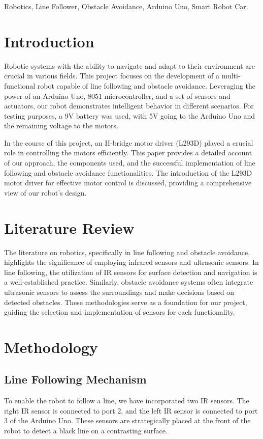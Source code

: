 \documentclass[conference]{IEEEtran}
\begin{document}
\begin{IEEEkeywords}
Robotics, Line Follower, Obstacle Avoidance, Arduino Uno, Smart Robot Car.
\end{IEEEkeywords}

\section{Introduction}
Robotic systems with the ability to navigate and adapt to their environment are crucial in various fields. This project focuses on the development of a multi-functional robot capable of line following and obstacle avoidance. Leveraging the power of an Arduino Uno, 8051 microcontroller, and a set of sensors and actuators, our robot demonstrates intelligent behavior in different scenarios. For testing purposes, a 9V battery was used, with 5V going to the Arduino Uno and the remaining voltage to the motors.

In the course of this project, an H-bridge motor driver (L293D) played a crucial role in controlling the motors efficiently. This paper provides a detailed account of our approach, the components used, and the successful implementation of line following and obstacle avoidance functionalities. The introduction of the L293D motor driver for effective motor control is discussed, providing a comprehensive view of our robot's design.

\section{Literature Review}
The literature on robotics, specifically in line following and obstacle avoidance, highlights the significance of employing infrared sensors and ultrasonic sensors. In line following, the utilization of IR sensors for surface detection and navigation is a well-established practice. Similarly, obstacle avoidance systems often integrate ultrasonic sensors to assess the surroundings and make decisions based on detected obstacles. These methodologies serve as a foundation for our project, guiding the selection and implementation of sensors for each functionality.

\section{Methodology}
\subsection{Line Following Mechanism}
To enable the robot to follow a line, we have incorporated two IR sensors. The right IR sensor is connected to port 2, and the left IR sensor is connected to port 3 of the Arduino Uno. These sensors are strategically placed at the front of the robot to detect a black line on a contrasting surface.
\end{document}
